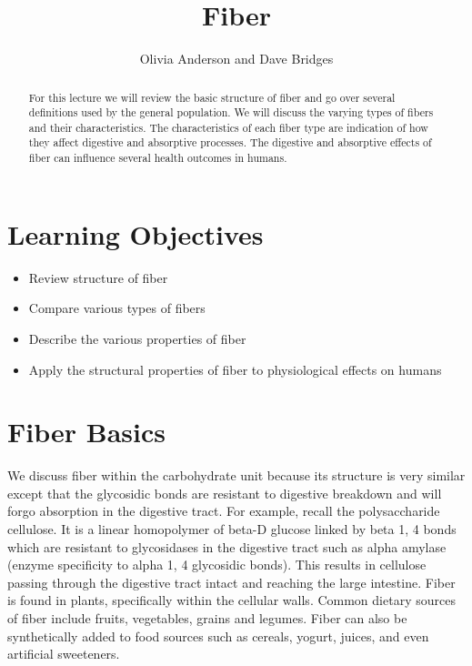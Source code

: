 \documentclass{tufte-handout}
\title{Fiber}
\author{Olivia Anderson and Dave Bridges}
\begin{document}
\maketitle%
\begin{abstract}
For this lecture we will review the basic structure of fiber and go over several definitions used by the general population. We will discuss the varying types of fibers and their characteristics. The characteristics of each fiber type are indication of how they affect digestive and absorptive processes. The digestive and absorptive effects of fiber can influence several health outcomes in humans.
\end{abstract}

\tableofcontents


\pagebreak

\section{Learning Objectives}

\begin{itemize}

\item Review structure of fiber
\item Compare various types of fibers
\item Describe the various properties of fiber
\item Apply the structural properties of fiber to physiological effects on humans
\end{itemize}

\section{Fiber Basics}
We discuss fiber within the carbohydrate unit because its structure is very similar except that the glycosidic bonds are resistant to digestive breakdown and will forgo absorption in the digestive tract. For example, recall the polysaccharide cellulose. It is a linear homopolymer of beta-D glucose linked by beta 1, 4 bonds which are resistant to glycosidases in the digestive tract such as alpha amylase (enzyme specificity to alpha 1, 4 glycosidic bonds). This results in cellulose passing through the digestive tract intact and reaching the large intestine. Fiber is found in plants, specifically within the cellular walls. Common dietary sources of fiber include fruits, vegetables, grains and legumes. Fiber can also be synthetically added to food sources such as cereals, yogurt, juices, and even artificial sweeteners.
\end{document}
